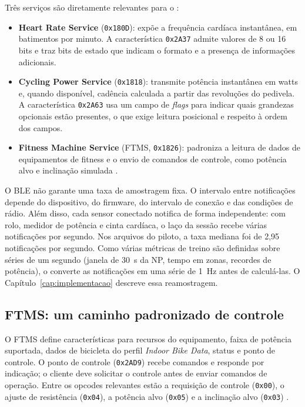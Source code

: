 Três serviços são diretamente relevantes para o \argus{}:

\begin{itemize}
    \item \textbf{Heart Rate Service} (\texttt{0x180D}): expõe a frequência
        cardíaca instantânea, em batimentos por minuto. A característica
        \texttt{0x2A37} admite valores de 8 ou 16 bits e traz bits de estado
        que indicam o formato e a presença de informações adicionais.
    \item \textbf{Cycling Power Service} (\texttt{0x1818}): transmite potência
        instantânea em watts e, quando disponível, cadência calculada a partir
        das revoluções do pedivela. A característica \texttt{0x2A63} usa um
        campo de \textit{flags} para indicar quais grandezas opcionais estão
        presentes, o que exige leitura posicional e respeito à ordem dos
        campos.
    \item \textbf{Fitness Machine Service} (FTMS, \texttt{0x1826}): padroniza
        a leitura de dados de equipamentos de fitness e o envio de comandos de
        controle, como potência alvo e inclinação simulada
        \cite{bluetooth2017}.
\end{itemize}

O BLE não garante uma taxa de amostragem fixa. O intervalo entre notificações
depende do dispositivo, do firmware, do intervalo de conexão e das condições de
rádio. Além disso, cada sensor conectado notifica de forma independente: com
rolo, medidor de potência e cinta cardíaca, o laço da sessão recebe várias
notificações por segundo. Nos arquivos do piloto, a taxa mediana foi de 2,95
notificações por segundo. Como várias métricas
de treino são definidas sobre séries de um segundo (janela de 30~s da NP, tempo
em zonas, recordes de potência), o \argus{} converte as notificações em uma
série de \SI{1}{\hertz} antes de calculá-las. O
Capítulo~\ref{cap:implementacao} descreve essa reamostragem.

\subsection{FTMS: um caminho padronizado de controle}
\label{sec:ftms}

O FTMS define características para recursos do equipamento, faixa de potência
suportada, dados de bicicleta do perfil \textit{Indoor Bike Data}, status e ponto
de controle. O ponto de controle (\texttt{0x2AD9}) recebe comandos e responde
por indicação; o cliente deve solicitar o controle antes de enviar comandos de
operação. Entre os
opcodes relevantes estão a requisição de controle (\texttt{0x00}), o ajuste de
resistência (\texttt{0x04}), a potência alvo (\texttt{0x05}) e a inclinação
alvo (\texttt{0x03}) \cite{bluetooth2017}.

